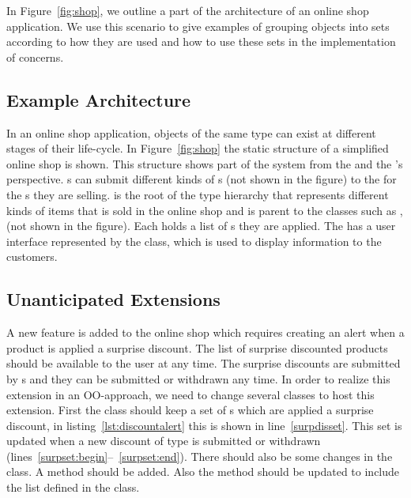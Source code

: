 In Figure~\ref{fig:shop}, we outline a part of the architecture of an online shop application. We use this scenario to give examples of grouping objects into sets according to how they are used and how to use these sets in the implementation of concerns. 

\subsection{Example Architecture}
In an online shop application, objects of the same type can exist at different stages of their life-cycle. In Figure~\ref{fig:shop} the static structure of a simplified online shop is shown. This structure shows part of the system from the  and the 's perspective. s can submit different kinds of s (not shown in the figure) to the  for the s they are selling.  is the root of the type hierarchy that represents different kinds of items that is sold in the online shop and is parent to the classes such as ,  (not shown in the figure). Each  holds a list of s they are applied. The  has a user interface represented by the  class, which is used to display information to the customers. 


\subsection{Unanticipated Extensions}
A new feature is added to the online shop which requires creating an alert when a product is applied a surprise discount. The list of surprise discounted products should be available to the user at any time. The surprise discounts are submitted by s and they can be submitted or withdrawn any time.  In order to realize this extension in an OO-approach, we need to change several classes to host this extension. First the class  should keep a set of s which are applied a surprise discount, in listing~\ref{lst:discountalert} this is shown in line~\ref{surpdisset}. This set is updated when a new discount of type  is submitted or withdrawn (lines~\ref{surpset:begin}--~\ref{surpset:end}). There should also be some changes in the  class. A  method should be added. Also the  method should be updated to include the  list defined in the  class.


